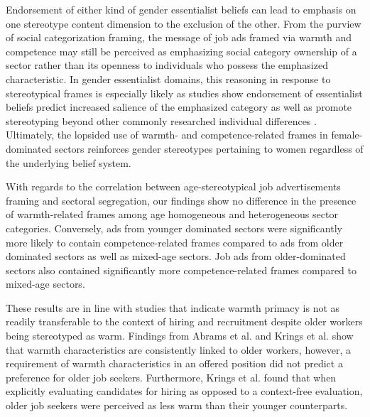 \documentclass[Royal,sageapa,times]{sagej}
\begin{document}
Endorsement of either kind of gender essentialist beliefs can lead to emphasis on one stereotype content dimension to the exclusion of the other. From the purview of social categorization framing, the message of job ads framed via warmth and competence may still be perceived as emphasizing social category ownership of a sector rather than its openness to individuals who possess the emphasized characteristic. In gender essentialist domains, this reasoning in response to stereotypical frames is especially likely as studies show endorsement of essentialist beliefs predict increased salience of the emphasized category as well as promote stereotyping beyond other commonly researched individual differences . Ultimately, the lopsided use of warmth- and competence-related frames in female-dominated sectors reinforces gender stereotypes pertaining to women regardless of the underlying belief system.

With regards to the correlation between age-stereotypical job advertisements framing and sectoral segregation, our findings show no difference in the presence of warmth-related frames among age homogeneous and heterogeneous sector categories. Conversely, ads from younger dominated sectors were significantly more likely to contain competence-related frames compared to ads from older dominated sectors as well as mixed-age sectors. Job ads from older-dominated sectors also contained significantly more competence-related frames compared to mixed-age sectors.

These results are in line with studies that indicate warmth primacy is not as readily transferable to the context of hiring and recruitment despite older workers being stereotyped as warm. Findings from Abrams et al. \citeyear{abramsOldUnemployableHow2016} and Krings et al. \citeyear{kringsStereotypicalInferencesMediators2011} show that warmth characteristics are consistently linked to older workers, however, a requirement of warmth characteristics in an offered position did not predict a preference for older job seekers. Furthermore, Krings et al. \citeyear{kringsStereotypicalInferencesMediators2011} found that when explicitly evaluating candidates for hiring as opposed to a context-free evaluation, older job seekers were perceived as less warm than their younger counterparts.
\end{document}
